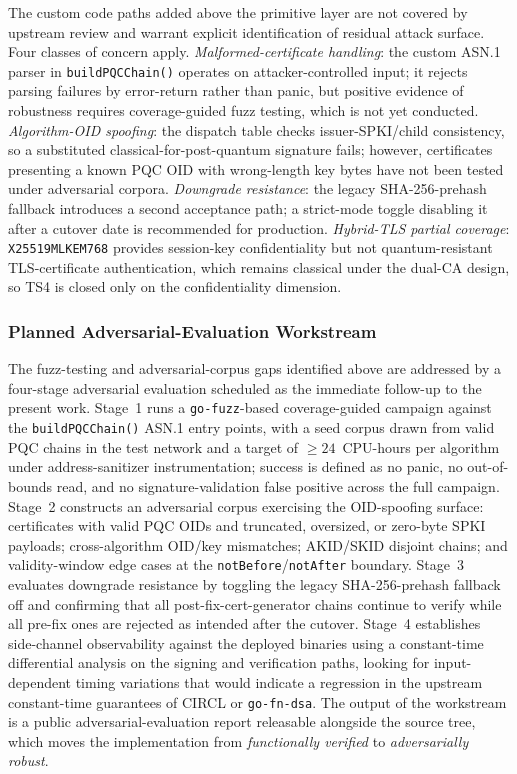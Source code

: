 \documentclass{ieeetj}
\begin{document}
The custom code paths added above the primitive layer are not covered by upstream
review and warrant explicit identification of residual attack surface. Four
classes of concern apply. \textit{Malformed-certificate handling}: the custom
ASN.1 parser in \texttt{buildPQCChain()} operates on attacker-controlled input;
it rejects parsing failures by error-return rather than panic, but
positive evidence of robustness requires coverage-guided fuzz testing, which
is not yet conducted. \textit{Algorithm-OID spoofing}: the dispatch table checks
issuer-SPKI/child consistency, so a substituted classical-for-post-quantum
signature fails; however, certificates presenting a known PQC OID with
wrong-length key bytes have not been tested under adversarial corpora.
\textit{Downgrade resistance}: the legacy SHA-256-prehash fallback introduces a
second acceptance path; a strict-mode toggle disabling it after a cutover date is
recommended for production. \textit{Hybrid-TLS partial coverage}:
\texttt{X25519MLKEM768} provides session-key confidentiality but not
quantum-resistant TLS-certificate authentication, which remains classical under
the dual-CA design, so TS4 is closed only on the confidentiality dimension.

\subsubsection{Planned Adversarial-Evaluation Workstream}
\label{sec:res_adversarial_plan}

The fuzz-testing and adversarial-corpus gaps identified above are addressed
by a four-stage adversarial evaluation scheduled as the immediate follow-up
to the present work. Stage~1 runs a \texttt{go-fuzz}-based coverage-guided
campaign against the \texttt{buildPQCChain()} ASN.1 entry points, with a
seed corpus drawn from valid PQC chains in the test network and a target
of $\geq 24$~CPU-hours per algorithm under address-sanitizer
instrumentation; success is defined as no panic, no out-of-bounds read, and
no signature-validation false positive across the full campaign.
Stage~2 constructs an adversarial corpus exercising the OID-spoofing
surface: certificates with valid PQC OIDs and truncated, oversized, or
zero-byte SPKI payloads; cross-algorithm OID/key mismatches; AKID/SKID
disjoint chains; and validity-window edge cases at the
\texttt{notBefore}/\texttt{notAfter} boundary. Stage~3 evaluates downgrade
resistance by toggling the legacy SHA-256-prehash fallback off and
confirming that all post-fix-cert-generator chains continue to verify
while all pre-fix ones are rejected as intended after the cutover.
Stage~4 establishes side-channel observability against the deployed
binaries using a constant-time differential analysis on the signing and
verification paths, looking for input-dependent timing variations that
would indicate a regression in the upstream constant-time guarantees of
CIRCL or \texttt{go-fn-dsa}. The output of the workstream is a public
adversarial-evaluation report releasable alongside the source tree, which
moves the implementation from \emph{functionally verified} to
\emph{adversarially robust}.
\end{document}
